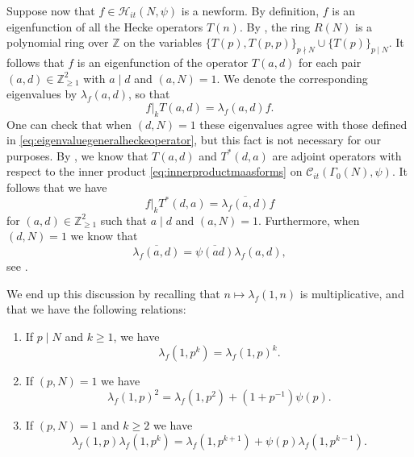 \documentclass{article}
\theoremstyle{named}
\newcommand{\C}{\mathcal{C}}
\newcommand{\HH}{\mathcal{H}}
\newcommand{\Z}{\mathbb{Z}}
\begin{document}
Suppose now that $f \in \HH_{it}(N, \psi)$ is a newform. By definition, $f$ is an eigenfunction of all the Hecke operators $T(n)$. By \cite[Theorem 4.5.9]{miyake}, the ring $R(N)$ is a polynomial ring over $\Z$ on the variables $\{T(p), T(p, p)\}_{p \nmid N} \cup \{T(p)\}_{p \mid N}$. It follows that $f$ is an eigenfunction of the operator $T(a, d)$ for each pair $(a, d)\in \Z_{\geq 1}^2$ with $a \mid d$ and $(a, N) = 1$. We denote the corresponding eigenvalues by $\lambda_f(a, d)$, so that 
\begin{equation*}
    f|_k T(a, d) = \lambda_f(a, d)f.
\end{equation*} 
One can check that when $(d, N) = 1$ these eigenvalues agree with those defined in \eqref{eq:eigenvaluegeneralheckeoperator}, but this fact is not necessary for our purposes. By \cite[Theorem 4.5.4(2)]{miyake}, we know that $T(a, d)$ and $T^*(d, a)$ are adjoint operators with respect to the inner product \eqref{eq:innerproductmaasforms} on $\C_{it}(\Gamma_0(N), \psi)$. It follows that we have 
\begin{equation*}
    f|_k T^*(d, a) = \overline{\lambda_f(a, d)}f
\end{equation*}
for $(a, d) \in \Z_{\geq 1}^2$ such that $a \mid d$ and $(a, N) = 1$. Furthermore, when $(d, N) = 1$ we know that 
\begin{equation*}
    \overline{\lambda_f(a, d)} = \overline{\psi(ad)}\lambda_f(a, d),
\end{equation*}
see \cite[Theorem 4.5.4(1)]{miyake}.

We end up this discussion by recalling that $n \mapsto \lambda_f(1, n)$ is multiplicative, and that we have the following relations:
\begin{enumerate}
    \item [i)] If $p \mid N$ and $k \geq 1$, we have \begin{equation*}
        \lambda_f(1, p^k) = \lambda_f(1, p)^k.
    \end{equation*} 
    \item [ii)] If $(p, N) = 1$ we have 
    \begin{equation*}
        \lambda_f(1,p)^2 = \lambda_f(1, p^2) + (1 + p^{-1})\psi(p).
    \end{equation*}
    \item [iii)] If $(p, N) = 1$ and $k \geq 2$ we have 
    \begin{equation*}
        \lambda_f(1, p)\lambda_f(1, p^k) = \lambda_f(1, p^{k + 1}) + \psi(p)\lambda_f(1, p^{k-1}).
    \end{equation*}
\end{enumerate}
\end{document}
